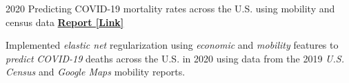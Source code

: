 \begin{cventries}
  \cventry
    {2020} %
    {Predicting COVID-19 mortality rates across the U.S. using mobility and census data} %
    {\href{https://drive.google.com/file/d/1l9TLGLmstkJsvOJQPxHe_f35b4fEkDU4/view}{\textbf{Report [Link]}}}
    {}
    {
      \begin{cvitems} %
      	\item {Implemented \textit{elastic net} regularization using \textit{economic} and \textit{mobility} features to \textit{predict} \textit{COVID-19} deaths across the U.S. in 2020 using data from the 2019 \textit{U.S. Census} and \textit{Google Maps} mobility reports.}
      \end{cvitems}
    }
    
\end{cventries}
